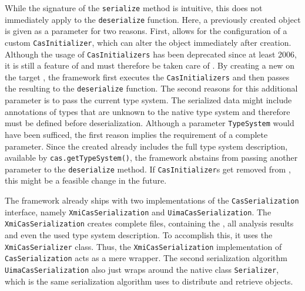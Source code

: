 While the signature of the \lstinline|serialize| method is intuitive, this does not immediately apply to the \lstinline|deserialize| function. Here, a previously created \cas{} object is given as a parameter for two reasons. First, \uima{} allows for the configuration of a custom \lstinline|CasInitializer|, which can alter the \cas{} object immediately after creation. Although the usage of \lstinline|CasInitializers| has been deprecated since at least 2006, it is still a feature of \uima{} and must therefore be taken care of \cite{uimacpe}. By creating a new \cas{} on the target \jvm{}, the framework first executes the \lstinline|CasInitializers| and then passes the resulting \cas{} to the \lstinline|deserialize| function. The second reasons for this additional parameter is to pass the current \uima{} type system. The serialized data might include annotations of types that are unknown to the native \uima{} type system and therefore must be defined before deserialization. Although a parameter \lstinline|TypeSystem| would have been sufficed, the first reason implies the requirement of a complete \cas{} parameter. Since the created \cas{} already includes the full type system description, available by \lstinline|cas.getTypeSystem()|, the framework abstains from passing another parameter to the \lstinline|deserialize| method. If \lstinline|CasInitializer|s get removed from \uima{}, this might be a feasible change in the future.

The framework already ships with two implementations of the \lstinline|CasSerialization| interface, namely \lstinline|XmiCasSerialization| and \lstinline|UimaCasSerialization|. The \lstinline|XmiCasSerialization| creates complete \xmi{} files, containing the \sofa{}, all analysis results and even the used type system description. To accomplish this, it uses the \uima{} \lstinline|XmiCasSerializer| class. Thus, the \lstinline|XmiCasSerialization| implementation of \lstinline|CasSerialization| acts as a mere wrapper. The second serialization algorithm \lstinline|UimaCasSerialization| also just wraps around the native \uima{} class \lstinline|Serializer|, which is the same serialization algorithm \uimaas{} uses to distribute and retrieve \cas{} objects.

